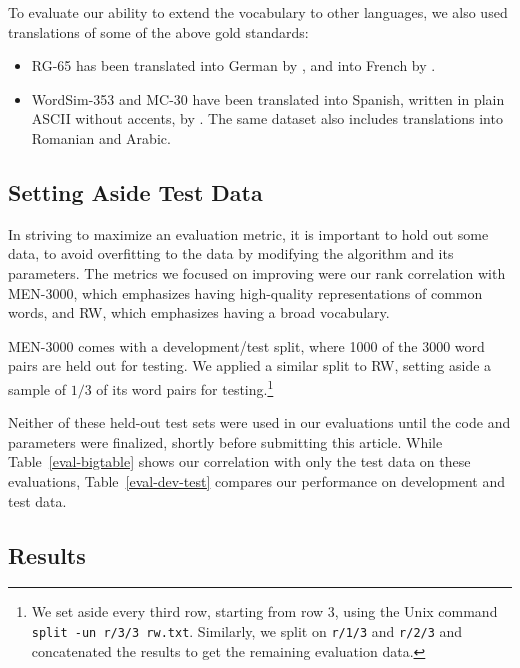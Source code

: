 \documentclass[letterpaper]{article}
\begin{document}
To evaluate our ability to extend the vocabulary to other languages, we also
used translations of some of the above gold standards:

\begin{itemize}
\item RG-65 has been translated into German by ,
    and into French by .
\item WordSim-353 and MC-30 have been translated into Spanish, written in
    plain ASCII without accents, by . The
    same dataset also includes translations into Romanian and Arabic.
\end{itemize}

\subsection{Setting Aside Test Data}

In striving to maximize an evaluation metric, it is important to hold out some
data, to avoid overfitting to the data by modifying the algorithm and its
parameters. The metrics we focused on improving were our rank correlation with
MEN-3000, which emphasizes having high-quality representations of common words,
and RW, which emphasizes having a broad vocabulary.

MEN-3000 comes with a development/test split, where 1000 of the 3000 word pairs
are held out for testing. We applied a similar split to RW, setting aside a
sample of $1/3$ of its word pairs for testing.\footnote{
    We set aside every third row, starting from row 3, using the Unix command
    {\tt split -un r/3/3 rw.txt}. Similarly, we split on {\tt r/1/3} and
    {\tt r/2/3} and concatenated the results to get the remaining evaluation
    data.
}

Neither of these held-out test sets were used in our evaluations until the code
and parameters were finalized, shortly before submitting this article. While
Table~\ref{eval-bigtable} shows our correlation with only the test data on these
evaluations, Table~\ref{eval-dev-test} compares our performance on development
and test data.

\subsection{Results}
\end{document}
